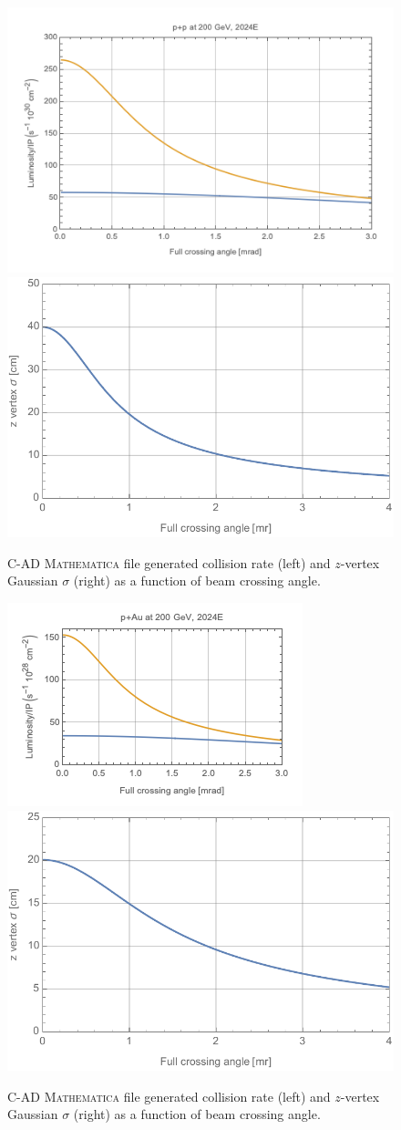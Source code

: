 \begin{figure}[h!]
    \centering
        \includegraphics[width=0.47\linewidth]{figs/figure_cad2_prelim.png}  
    \includegraphics[width=0.43\linewidth]{figs/pp200-2023-202008131-z.pdf}
    \caption{C-AD {\textsc{Mathematica}} file generated \pp collision rate (left) and $z$-vertex Gaussian $\sigma$ (right) as a function of beam crossing angle.}
    \label{fig:mathpp1}
\end{figure}

\begin{figure}[h!]
    \centering
        \includegraphics[width=0.47\linewidth]{figs/figure_cad3_prelim.png}  
    \includegraphics[width=0.43\linewidth]{figs/pau200-2024-202008140-z.pdf}
    \caption{C-AD {\textsc{Mathematica}} file generated \pau collision rate (left) and $z$-vertex Gaussian $\sigma$ (right) as a function of beam crossing angle.}
    \label{fig:mathpau1}
\end{figure}

